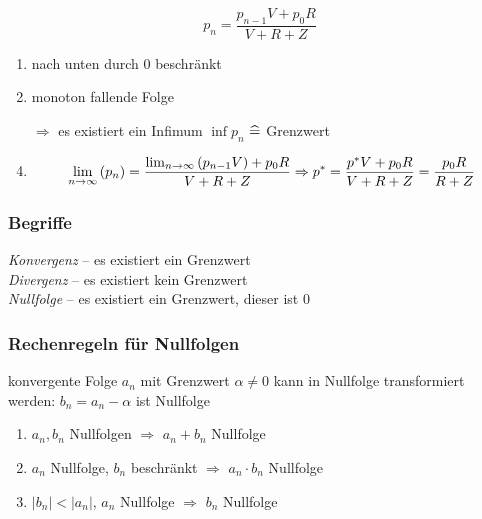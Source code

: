 \begin{example}[Evakuierungspumpe]
  \[ p_n = \frac{p_{n-1}V+p_0R}{V+R+Z} \]
  \begin{enumerate}
    \item nach unten durch $0$ beschränkt
    \item monoton fallende Folge
    \item[$\Rightarrow$] es existiert ein Infimum $\inf p_n$ $\mathrel{\widehat{=}}$ Grenzwert
    \item
      \begin{equation*}
        \lim_{n \rightarrow \infty} \left( p_n \right) = \frac{\lim_{n \rightarrow \infty} \left( p_{n-1}V \right)+p_0R}{V+R+Z} \Rightarrow
        p^\ast = \frac{p^\ast V+p_0R}{V+R+Z} = \frac{p_0R}{R+Z}
      \end{equation*}
  \end{enumerate}
\end{example}

\subsubsection*{Begriffe}

\emph{Konvergenz} -- es existiert ein Grenzwert\\
\emph{Divergenz} -- es existiert kein Grenzwert\\
\emph{Nullfolge} -- es existiert ein Grenzwert, dieser ist $0$

\subsubsection*{Rechenregeln für Nullfolgen}

\begin{note}
  konvergente Folge $a_n$ mit Grenzwert $\alpha \neq 0$ kann in Nullfolge transformiert werden: $b_n = a_n - \alpha$ ist Nullfolge
\end{note}

\begin{enumerate}
  \item $a_n, b_n$ Nullfolgen $\Rightarrow$ $a_n+b_n$ Nullfolge
  \item $a_n$ Nullfolge, $b_n$ beschränkt $\Rightarrow$ $a_n\cdot b_n$ Nullfolge
  \item $\left|b_n\right| < \left|a_n\right|$, $a_n$ Nullfolge  $\Rightarrow$ $b_n$ Nullfolge
\end{enumerate}


